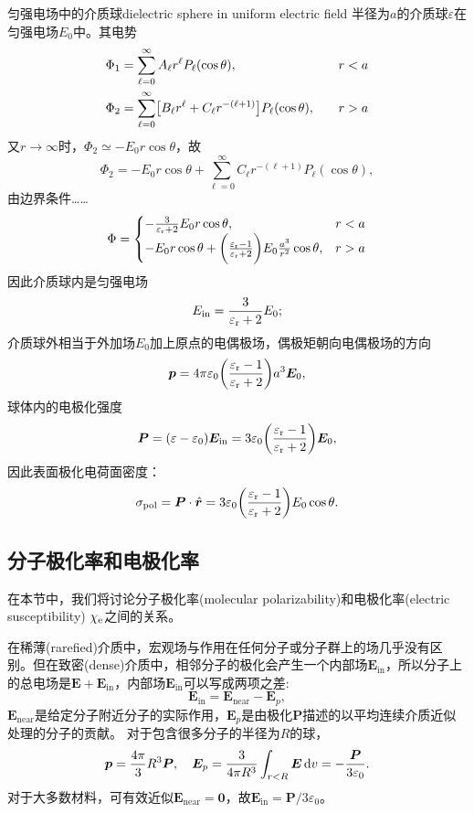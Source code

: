 \begin{example}{匀强电场中的介质球}{dielectric sphere in uniform electric field}
    半径为$a$的介质球$\varepsilon$在匀强电场$E_0$中。其电势
    \begin{alignat*}{2}
        \Phi_1&=\sum_{\ell=0}^\infty A_\ell r^\ell P_\ell(\cos\theta),&\quad&r<a\\
        \Phi_2&=\sum_{\ell=0}^\infty\bigl[B_\ell r^\ell+C_\ell r^{-(\ell+1)}\bigr]P_\ell(\cos\theta),&&r>a
    \end{alignat*}
    又$r\to\infty$时，$\Phi_2\simeq -E_0r\cos\theta$，故 
    \[
        \Phi_2=-E_0r\cos\theta+\sum_{\ell=0}^\infty C_\ell r^{-(\ell+1)}P_\ell(\cos\theta),
    \]
    由边界条件……
    \[
        \Phi=\begin{cases}
            -\frac{3}{\varepsilon_\text r+2}E_0r\cos\theta,&r<a\\
            -E_0r\cos\theta+\biggl(\frac{\varepsilon_\text r-1}{\varepsilon_\text r+2}\biggr)E_0\frac{a^3}{r^2}\cos\theta,&r>a
        \end{cases}
    \]
    因此介质球内是匀强电场
    \[
        E_\text{in}=\frac{3}{\varepsilon_\text r+2}E_0;
    \]
    介质球外相当于外加场$E_0$加上原点的电偶极场，偶极矩朝向电偶极场的方向
    \[
        \bm p=4\pi\varepsilon_0\biggl(\frac{\varepsilon_\text r-1}{\varepsilon_\text r+2}\biggr)a^3\bm E_0,
    \]
    球体内的电极化强度
    \begin{equation}
        \label{eqn:P-E}
        \bm P=(\varepsilon-\varepsilon_0)\bm E_\text{in}=3\varepsilon_0\biggl(\frac{\varepsilon_\text r-1}{\varepsilon_\text r+2}\biggr)\bm E_0,
    \end{equation}
    因此表面极化电荷面密度：
    \[
        \sigma_\text{pol}=\bm P\cdot\mathop{}\!\hat{\bm{r}}=3\varepsilon_0\biggl(\frac{\varepsilon_\text r-1}{\varepsilon_\text r+2}\biggr)E_0\cos\theta.
    \]
\end{example}

\subsection{分子极化率和电极化率}
\label{ssec:molecular polarizability and electric susceptibility}

在本节中，我们将讨论分子极化率(molecular polarizability)和电极化率(electric susceptibility) $\chi_\mathrm e$之间的关系。%

在稀薄(rarefied)介质中，宏观场与作用在任何分子或分子群上的场几乎没有区别。但在致密(dense)介质中，相邻分子的极化会产生一个内部场$\bm E_\text{in}$，所以分子上的总电场是$\bm E+\bm E_\text{in}$，内部场$\bm E_\text{in}$可以写成两项之差:
\[
    \bm E_\text{in}=\bm E_\text{near}-\bm E_p,
\]
$\bm E_\text{near}$是给定分子附近分子的实际作用，$\bm E_p$是由极化$\bm P$描述的以平均连续介质近似处理的分子的贡献。
对于包含很多分子的半径为$R$的球， 
\[
    \bm p=\frac{4\pi}3R^3\bm P,\quad \bm E_p=\frac3{4\pi R^3}\int_{r<R}\bm E\mathop{}\!\mathrm{d} v=-\frac{\bm P}{3\varepsilon_0}.
\]
对于大多数材料，可有效近似$\bm E_\text{near}=\bm 0$，故$\bm E_\text{in}=\bm P/3\varepsilon_0$。

